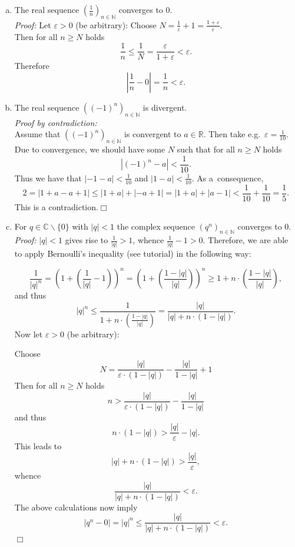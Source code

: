 \begin{example}\label{ex:basicconvseq}
 \begin{enumerate}[(a)]
  \item The real sequence $(\frac1n)_{n\in\mathbb{N}}$ converges to 0.\\
{\em Proof:} Let $\varepsilon>0$ (be arbitrary): Choose $N=\frac1\varepsilon+1=\frac{1+\varepsilon}\varepsilon$.\\
Then for all $n\geq N$ holds
\[\frac1n\leq\frac1N=\frac{\varepsilon}{1+\varepsilon}<\varepsilon.\]
Therefore
\[\left|\frac1n-0\right|=\frac1n<\varepsilon.\]
	\whiteskipsmall
\item  The real sequence $((-1)^n)_{n\in\mathbb{N}}$ is divergent.\\
{\em Proof by contradiction:}\\
Assume that $((-1)^n)_{n\in\mathbb{N}}$ is convergent to $a\in\mathbb{R}$. Then take e.g.\ $\varepsilon=\frac1{10}$. Due to convergence, we should have some $N$ such that for all $n\geq N$ holds
\[|(-1)^n-a|<{\textstyle\frac1{10}}.\]
Thus we have that $|-1-a|<\frac1{10}$ and $|1-a|<\frac1{10}$. As a~consequence,
\[2=|1+a-a+1|\leq|1+a|+|-a+1|=|1+a|+|a-1|<{\textstyle\frac1{10}+\frac1{10}=\frac1{5}}.\]
This is a contradiction.\hfill$\Box$
\item For $q\in\mathbb{C}\backslash\{0\}$ with $|q|<1$ the complex sequence $(q^n)_{n\in\mathbb{N}}$ converges to 0.\\
{\em Proof:}
$|q|<1$ gives rise to $\frac1{|q|}>1$, whence $\frac1{|q|}-1>0$. Therefore, we are able to apply Bernoulli's inequality (see tutorial) in the following way:

\[\frac1{|q|^n}=\left(1+\left(\frac1{|q|}-1\right)\right)^n
=\left(1+\left(\frac{1-|q|}{|q|}\right)\right)^n\geq 1+n\cdot \left(\frac{1-|q|}{|q|}\right),
\]
and thus
\[|q|^n\leq \frac1{1+n\cdot \left(\frac{1-|q|}{|q|}\right)}=\frac{|q|}{|q|+n\cdot ({1-|q|})}.\]
Now let $\varepsilon>0$ (be arbitrary):

Choose
\[N=\frac{|q|}{\varepsilon\cdot(1-|q|)}-\frac{|q|}{1-|q|}+1\]
Then for all $n\geq N$ holds
\[n>\frac{|q|}{\varepsilon\cdot(1-|q|)}-\frac{|q|}{1-|q|}\]
and thus
\[n\cdot ({1-|q|})>\frac{|q|}{\varepsilon}-|q|.\]
This leads to
\[|q|+n\cdot ({1-|q|})>\frac{|q|}{\varepsilon},\]
whence
\[\frac{|q|}{|q|+n\cdot ({1-|q|})}<\varepsilon.\]
The above calculations now imply
\[|q^n-0|=|q|^n\leq\frac{|q|}{|q|+n\cdot ({1-|q|})}<\varepsilon.\]
\hfill$\Box$
 \end{enumerate}
\end{example}

